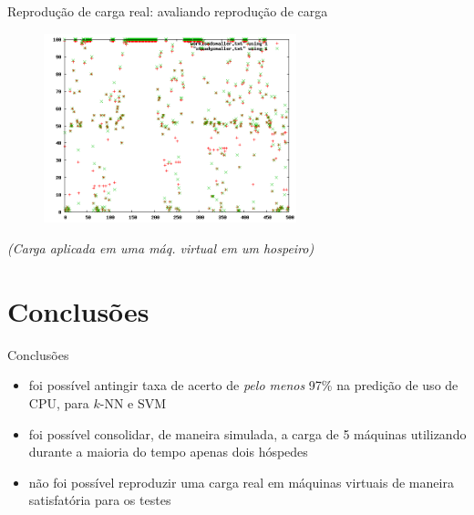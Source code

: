\documentclass{beamer}
\begin{document}
\begin{frame}{Reprodução de carga real: avaliando reprodução de carga}
\begin{figure}
\centering
\includegraphics[height=5.5cm]{src/test-data/checking-load-simulator/load-simulator-n4.png}
\end{figure}
\tiny{\emph{(Carga aplicada em uma máq. virtual em um hospeiro)}}
\end{frame}

\section{Conclusões}

\begin{frame}{Conclusões}
\begin{itemize}
  \item foi possível antingir taxa de acerto de \emph{pelo menos} 97\% na
        predição de uso de CPU, para $k$-NN e SVM
  \item foi possível consolidar, de maneira simulada, a carga de 5 máquinas
        utilizando durante a maioria do tempo apenas dois hóspedes
  \item não foi possível reproduzir uma carga real em máquinas virtuais de
        maneira satisfatória para os testes
\end{itemize}
\end{frame}

\end{document}
